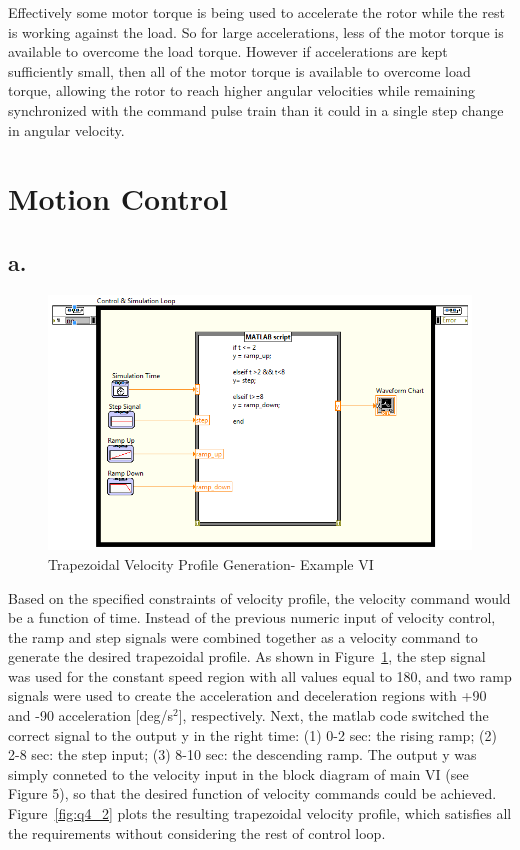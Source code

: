 \documentclass{article}
\theoremstyle{plain}
\theoremstyle{definition}
\theoremstyle{remark}
\begin{document}
Effectively some motor torque is being used to accelerate the rotor while the rest is working against the load.  So for large accelerations, less of the motor torque is available to overcome the load torque.  However if accelerations are kept sufficiently small, then all of the motor torque is available to overcome load torque, allowing the rotor to reach higher angular velocities while remaining synchronized with the command pulse train than it could in a single step change in angular velocity.  

\clearpage

\section{Motion Control}
\subsection*{a.}

\begin{figure}[h!]
\includegraphics[width=1\textwidth]{Q4_CommandGeneration_VI.png}
\caption{Trapezoidal Velocity Profile Generation- Example VI} \label{tex}
\label{fig:q4_1}
\end{figure}

Based on the specified constraints of velocity profile, the velocity command would be a function of time. Instead of the previous numeric input of velocity control, the ramp and step signals were combined together as a velocity command to generate the desired trapezoidal profile. As shown in Figure~\ref{fig:q4_1}, the step signal was used for the constant speed region with all values equal to 180, and two ramp signals were used to create the acceleration and deceleration regions with +90 and -90 acceleration [deg/s$^{2}$], respectively. Next, the matlab code switched the correct signal to the output y in the right time: (1) 0-2 sec: the rising ramp; (2) 2-8 sec: the step input; (3) 8-10 sec: the descending ramp. The output y was simply conneted to the velocity input in the block diagram of main VI (see Figure 5), so that the desired function of velocity commands could be achieved. Figure~\ref{fig:q4_2} plots the resulting trapezoidal velocity profile, which satisfies all the requirements without considering the rest of control loop.
\end{document}
